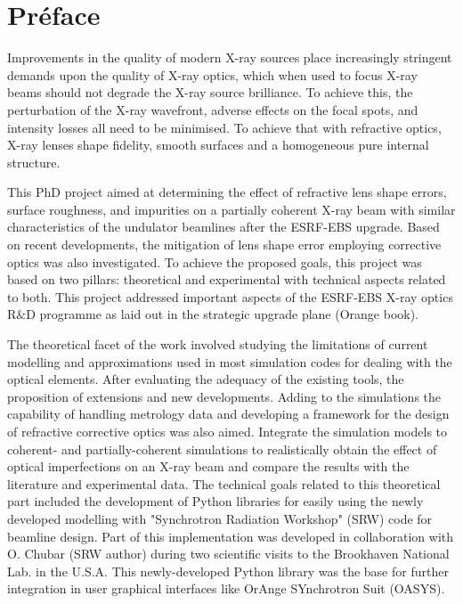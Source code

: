 \chapter*{Préface}


Improvements in the quality of modern X-ray sources place increasingly stringent demands upon the quality of X-ray optics, which when used to focus X-ray beams should not degrade the X-ray source brilliance. To achieve this, the perturbation of the X-ray wavefront, adverse effects on the focal spots, and intensity losses all need to be minimised. To achieve that with refractive optics, X-ray lenses shape fidelity, smooth surfaces and a homogeneous pure internal structure. 

This PhD project aimed at determining the effect of refractive lens shape errors, surface roughness, and impurities on a partially coherent X-ray beam with similar characteristics of the undulator beamlines after the ESRF-EBS upgrade. Based on recent developments, the mitigation of lens shape error employing corrective optics was also investigated. To achieve the proposed goals, this project was based on two pillars: theoretical and experimental with technical aspects related to both. This project addressed important aspects of the ESRF-EBS X-ray optics R$\&$D programme as laid out in the strategic upgrade plane (Orange book).

The theoretical facet of the work involved studying the limitations of current modelling and approximations used in most simulation codes for dealing with the optical elements. After evaluating the adequacy of the existing tools, the proposition of extensions and new developments. Adding to the simulations the capability of handling metrology data and developing a framework for the design of refractive corrective optics was also aimed. Integrate the simulation models to coherent- and partially-coherent simulations to realistically obtain the effect of optical imperfections on an X-ray beam and compare the results with the literature and experimental data. The technical goals related to this theoretical part included the development of Python libraries for easily using the newly developed modelling with "Synchrotron Radiation Workshop" (SRW) code for beamline design. Part of this implementation was developed in collaboration with O. Chubar (SRW author) during two scientific visits to the Brookhaven National Lab. in the U.S.A. This newly-developed Python library was the base for further integration in user graphical interfaces like OrAnge SYnchrotron Suit (OASYS). 

